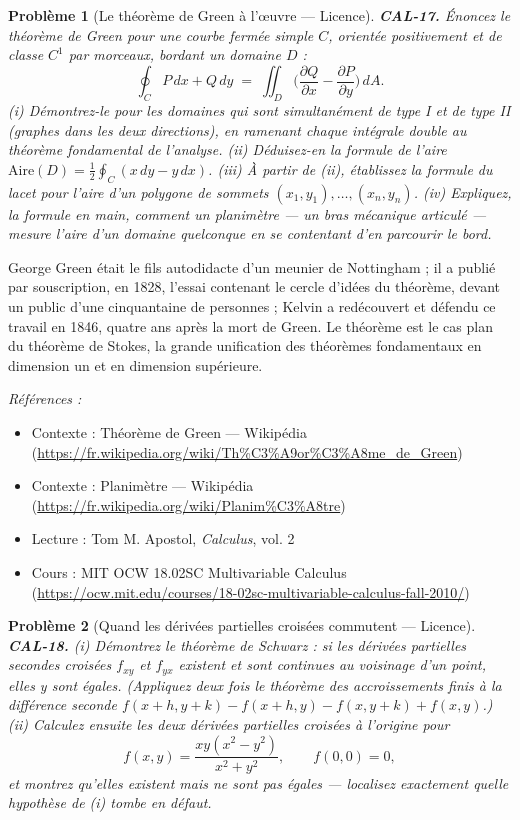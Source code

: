 \documentclass[11pt]{article}
\newtheorem{problem}{Problème}
\newenvironment{refs}{\par\small\noindent\emph{Références :}\begin{itemize}\setlength\itemsep{0pt}}{\end{itemize}\normalsize}
\begin{document}
\bigskip

\begin{problem}[{Le théorème de Green à l'\oe{}uvre --- Licence}]
\textbf{CAL-17.} Énoncez le théorème de Green pour une courbe fermée simple
$ C $, orientée positivement et de classe $ C^1 $ par morceaux, bordant un domaine $ D $ :
\[ \oint_C P\,dx + Q\,dy \;=\; \iint_D \Big( \frac{\partial Q}{\partial x} -
\frac{\partial P}{\partial y} \Big)\,dA. \]
(i) Démontrez-le pour les domaines qui sont simultanément de type I et de type II (graphes dans les deux
directions), en ramenant chaque intégrale double au théorème fondamental de l'analyse.
(ii) Déduisez-en la formule de l'aire $ \mathrm{Aire}(D) = \tfrac12 \oint_C (x\,dy - y\,dx) $.
(iii) À partir de (ii), établissez la formule du lacet pour l'aire d'un polygone de sommets
$ (x_1,y_1),\dots,(x_n,y_n) $. (iv) Expliquez, la formule en main, comment un
planimètre --- un bras mécanique articulé --- mesure l'aire d'un domaine quelconque en se contentant d'en
parcourir le bord.
\end{problem}

\noindent George Green était le fils autodidacte d'un meunier de Nottingham ; il a
publié par souscription, en 1828, l'essai contenant le cercle d'idées du théorème,
devant un public d'une cinquantaine de personnes ; Kelvin a redécouvert et défendu ce travail en 1846, quatre
ans après la mort de Green. Le théorème est le cas plan du théorème de Stokes, la
grande unification des théorèmes fondamentaux en dimension un et en dimension supérieure.

\begin{refs}
\item Contexte : Théorème de Green --- Wikipédia (\url{https://fr.wikipedia.org/wiki/Th%C3%A9or%C3%A8me_de_Green})
\item Contexte : Planimètre --- Wikipédia (\url{https://fr.wikipedia.org/wiki/Planim%C3%A8tre})
\item Lecture : Tom M. Apostol, \textit{Calculus}, vol. 2
\item Cours : MIT OCW 18.02SC Multivariable Calculus (\url{https://ocw.mit.edu/courses/18-02sc-multivariable-calculus-fall-2010/})
\end{refs}

\bigskip

\begin{problem}[{Quand les dérivées partielles croisées commutent --- Licence}]
\textbf{CAL-18.} (i) Démontrez le théorème de Schwarz : si les dérivées partielles
secondes croisées $ f_{xy} $ et $ f_{yx} $ existent et sont continues au voisinage d'un point, elles y sont
égales. (Appliquez deux fois le théorème des accroissements finis à la différence seconde
$ f(x+h,y+k) - f(x+h,y) - f(x,y+k) + f(x,y) $.) (ii) Calculez ensuite les deux dérivées partielles croisées
à l'origine pour
\[ f(x,y) = \frac{xy(x^2-y^2)}{x^2+y^2}, \qquad f(0,0)=0, \]
et montrez qu'elles existent mais ne sont \textit{pas} égales --- localisez exactement quelle hypothèse de (i)
tombe en défaut.
\end{problem}
\end{document}
